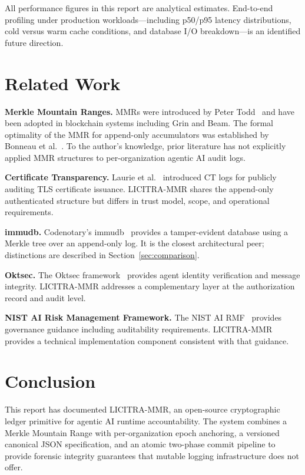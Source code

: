 \documentclass{article}
\begin{document}
All performance figures in this report are analytical estimates. End-to-end
profiling under production workloads---including p50/p95 latency distributions,
cold versus warm cache conditions, and database I/O breakdown---is an identified
future direction.

\section{Related Work}

\textbf{Merkle Mountain Ranges.} MMRs were introduced by Peter
Todd~\cite{todd2013} and have been adopted in blockchain systems including Grin
and Beam. The formal optimality of the MMR for append-only accumulators was
established by Bonneau et al.~\cite{bonneau2025}. To the author's knowledge,
prior literature has not explicitly applied MMR structures to per-organization
agentic AI audit logs.

\textbf{Certificate Transparency.} Laurie et al.~\cite{laurie2013} introduced CT
logs for publicly auditing TLS certificate issuance. LICITRA-MMR shares the
append-only authenticated structure but differs in trust model, scope, and
operational requirements.

\textbf{immudb.} Codenotary's immudb~\cite{immudb} provides a tamper-evident
database using a Merkle tree over an append-only log. It is the closest
architectural peer; distinctions are described in Section~\ref{sec:comparison}.

\textbf{Oktsec.} The Oktsec framework~\cite{oktsec} provides agent identity
verification and message integrity. LICITRA-MMR addresses a complementary layer
at the authorization record and audit level.

\textbf{NIST AI Risk Management Framework.} The NIST AI RMF~\cite{nistai}
provides governance guidance including auditability requirements. LICITRA-MMR
provides a technical implementation component consistent with that guidance.

\section{Conclusion}

This report has documented LICITRA-MMR, an open-source cryptographic ledger
primitive for agentic AI runtime accountability. The system combines a Merkle
Mountain Range with per-organization epoch anchoring, a versioned canonical JSON
specification, and an atomic two-phase commit pipeline to provide forensic
integrity guarantees that mutable logging infrastructure does not offer.
\end{document}
